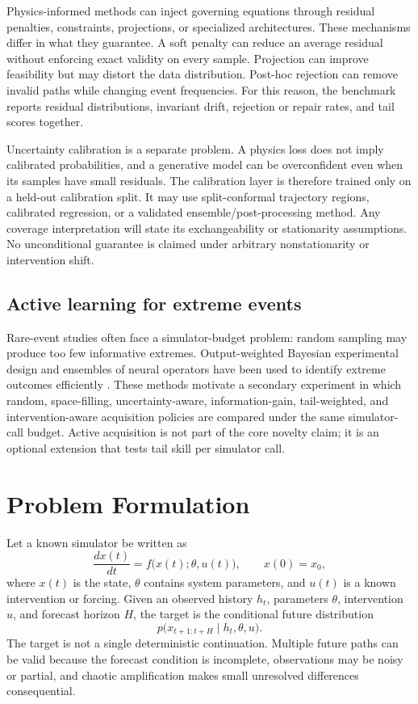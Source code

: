 \documentclass[11pt]{article}
\begin{document}
Physics-informed methods can inject governing equations through residual penalties, constraints, projections, or specialized architectures. These mechanisms differ in what they guarantee. A soft penalty can reduce an average residual without enforcing exact validity on every sample. Projection can improve feasibility but may distort the data distribution. Post-hoc rejection can remove invalid paths while changing event frequencies. For this reason, the benchmark reports residual distributions, invariant drift, rejection or repair rates, and tail scores together.

Uncertainty calibration is a separate problem. A physics loss does not imply calibrated probabilities, and a generative model can be overconfident even when its samples have small residuals. The calibration layer is therefore trained only on a held-out calibration split. It may use split-conformal trajectory regions, calibrated regression, or a validated ensemble/post-processing method. Any coverage interpretation will state its exchangeability or stationarity assumptions. No unconditional guarantee is claimed under arbitrary nonstationarity or intervention shift.

\subsection{Active learning for extreme events}

Rare-event studies often face a simulator-budget problem: random sampling may produce too few informative extremes. Output-weighted Bayesian experimental design and ensembles of neural operators have been used to identify extreme outcomes efficiently \cite{shayesteh2023extreme}. These methods motivate a secondary experiment in which random, space-filling, uncertainty-aware, information-gain, tail-weighted, and intervention-aware acquisition policies are compared under the same simulator-call budget. Active acquisition is not part of the core novelty claim; it is an optional extension that tests tail skill per simulator call.

\section{Problem Formulation}

Let a known simulator be written as
\begin{equation}
    \frac{d x(t)}{d t}=f\big(x(t);\theta,u(t)\big), \qquad x(0)=x_0,
\end{equation}
where $x(t)$ is the state, $\theta$ contains system parameters, and $u(t)$ is a known intervention or forcing. Given an observed history $h_t$, parameters $\theta$, intervention $u$, and forecast horizon $H$, the target is the conditional future distribution
\begin{equation}
    p\big(x_{t+1:t+H}\mid h_t,\theta,u\big).
\end{equation}
The target is not a single deterministic continuation. Multiple future paths can be valid because the forecast condition is incomplete, observations may be noisy or partial, and chaotic amplification makes small unresolved differences consequential.
\end{document}
